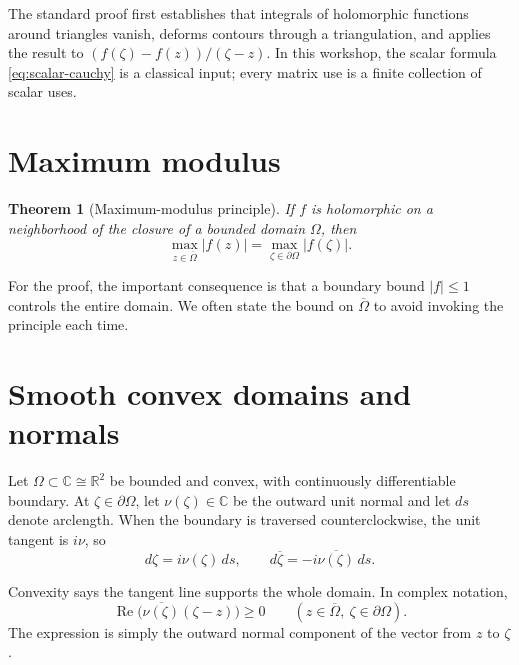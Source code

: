 \documentclass[11pt,oneside,openany]{book}
\newtheorem{theorem}{Theorem}[chapter]
\theoremstyle{definition}
\theoremstyle{remark}
\newcommand{\C}{\mathbb C}
\newcommand{\R}{\mathbb R}
\newcommand{\RePart}{\operatorname{Re}}
\begin{document}
\begin{blackbox}
The standard proof first establishes that integrals of holomorphic
functions around triangles vanish, deforms contours through a
triangulation, and applies the result to
\((f(\zeta)-f(z))/(\zeta-z)\).  In this workshop, the scalar formula
\eqref{eq:scalar-cauchy} is a classical input; every matrix use is a
finite collection of scalar uses.
\end{blackbox}

\section{Maximum modulus}

\begin{theorem}[Maximum-modulus principle]
If \(f\) is holomorphic on a neighborhood of the closure of a bounded
domain \(\Omega\), then
\[
  \max_{z\in\overline\Omega}|f(z)|
  =\max_{\zeta\in\partial\Omega}|f(\zeta)|.
\]
\end{theorem}

For the proof, the important consequence is that a boundary bound
\(|f|\leq1\) controls the entire domain.  We often state the bound on
\(\overline\Omega\) to avoid invoking the principle each time.

\section{Smooth convex domains and normals}

Let \(\Omega\subset\C\cong\R^2\) be bounded and convex, with
continuously differentiable boundary.  At
\(\zeta\in\partial\Omega\), let \(\nu(\zeta)\in\C\) be the outward
unit normal and let \(ds\) denote arclength.  When the boundary is
traversed counterclockwise, the unit tangent is \(i\nu\), so
\begin{equation}
  d\zeta=i\nu(\zeta)\,ds,
  \qquad
  d\overline\zeta=-i\overline{\nu(\zeta)}\,ds.
  \label{eq:orientation}
\end{equation}

Convexity says the tangent line supports the whole domain.  In complex
notation,
\begin{equation}
  \RePart\bigl(\overline{\nu(\zeta)}(\zeta-z)\bigr)\geq0
  \qquad
  (z\in\overline\Omega,\ \zeta\in\partial\Omega).
  \label{eq:supporting-line}
\end{equation}
The expression is simply the outward normal component of the vector
from \(z\) to \(\zeta\).
\end{document}
